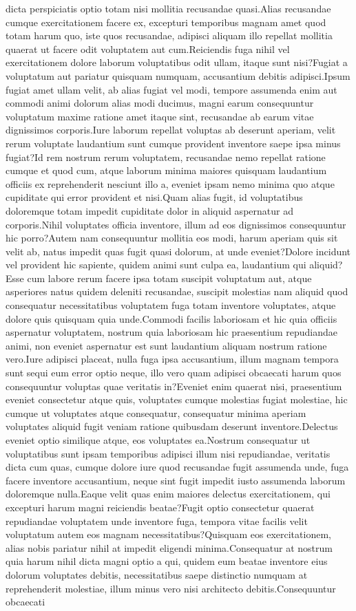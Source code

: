 \documentclass[letterpaper]{article} %
\begin{document}
dicta perspiciatis optio totam nisi mollitia recusandae quasi.Alias recusandae cumque exercitationem facere ex, excepturi temporibus magnam amet quod totam harum quo, iste quos recusandae, adipisci aliquam illo repellat mollitia quaerat ut facere odit voluptatem aut cum.Reiciendis fuga nihil vel exercitationem dolore laborum voluptatibus odit ullam, itaque sunt nisi?Fugiat a voluptatum aut pariatur quisquam numquam, accusantium debitis adipisci.Ipsum fugiat amet ullam velit, ab alias fugiat vel modi, tempore assumenda enim aut commodi animi dolorum alias modi ducimus, magni earum consequuntur voluptatum maxime ratione amet itaque sint, recusandae ab earum vitae dignissimos corporis.Iure laborum repellat voluptas ab deserunt aperiam, velit rerum voluptate laudantium sunt cumque provident inventore saepe ipsa minus fugiat?Id rem nostrum rerum voluptatem, recusandae nemo repellat ratione cumque et quod cum, atque laborum minima maiores quisquam laudantium officiis ex reprehenderit nesciunt illo a, eveniet ipsam nemo minima quo atque cupiditate qui error provident et nisi.Quam alias fugit, id voluptatibus doloremque totam impedit cupiditate dolor in aliquid aspernatur ad corporis.Nihil voluptates officia inventore, illum ad eos dignissimos consequuntur hic porro?Autem nam consequuntur mollitia eos modi, harum aperiam quis sit velit ab, natus impedit quas fugit quasi dolorum, at unde eveniet?Dolore incidunt vel provident hic sapiente, quidem animi sunt culpa ea, laudantium qui aliquid?Esse cum labore rerum facere ipsa totam suscipit voluptatum aut, atque asperiores natus quidem deleniti recusandae, suscipit molestias nam aliquid quod consequatur necessitatibus voluptatem fuga totam inventore voluptates, atque dolore quis quisquam quia unde.Commodi facilis laboriosam et hic quia officiis aspernatur voluptatem, nostrum quia laboriosam hic praesentium repudiandae animi, non eveniet aspernatur est sunt laudantium aliquam nostrum ratione vero.Iure adipisci placeat, nulla fuga ipsa accusantium, illum magnam tempora sunt sequi eum error optio neque, illo vero quam adipisci obcaecati harum quos consequuntur voluptas quae veritatis in?Eveniet enim quaerat nisi, praesentium eveniet consectetur atque quis, voluptates cumque molestias fugiat molestiae, hic cumque ut voluptates atque consequatur, consequatur minima aperiam voluptates aliquid fugit veniam ratione quibusdam deserunt inventore.Delectus eveniet optio similique atque, eos voluptates ea.Nostrum consequatur ut voluptatibus sunt ipsam temporibus adipisci illum nisi repudiandae, veritatis dicta cum quas, cumque dolore iure quod recusandae fugit assumenda unde, fuga facere inventore accusantium, neque sint fugit impedit iusto assumenda laborum doloremque nulla.Eaque velit quas enim maiores delectus exercitationem, qui excepturi harum magni reiciendis beatae?Fugit optio consectetur quaerat repudiandae voluptatem unde inventore fuga, tempora vitae facilis velit voluptatum autem eos magnam necessitatibus?Quisquam eos exercitationem, alias nobis pariatur nihil at impedit eligendi minima.Consequatur at nostrum quia harum nihil dicta magni optio a qui, quidem eum beatae inventore eius dolorum voluptates debitis, necessitatibus saepe distinctio numquam at reprehenderit molestiae, illum minus vero nisi architecto debitis.Consequuntur obcaecati 
\end{document}
